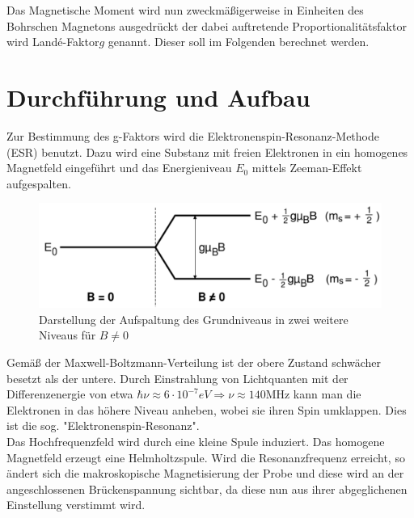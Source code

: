 Das Magnetische Moment wird nun zweckmäßigerweise in Einheiten des Bohrschen Magnetons ausgedrückt der dabei auftretende Proportionalitätsfaktor wird \glqq Landé-Faktor\grqq $g$  genannt. Dieser soll im Folgenden berechnet werden.
\section{Durchführung und Aufbau}
Zur Bestimmung des g-Faktors wird die Elektronenspin-Resonanz-Methode (ESR) benutzt. Dazu wird eine Substanz mit freien Elektronen in ein homogenes Magnetfeld eingeführt und das Energieniveau $E_0$ mittels Zeeman-Effekt aufgespalten.\\

\begin{figure}[H]
\includegraphics[scale=0.5]{../pics/aufsp.pdf}
\caption{Darstellung der Aufspaltung des Grundniveaus in zwei weitere Niveaus für $B\neq 0$}
\label{pic_aufspaltung}
\end{figure}

Gemäß der Maxwell-Boltzmann-Verteilung ist der obere Zustand schwächer besetzt als der untere. Durch Einstrahlung von Lichtquanten mit der Differenzenergie von etwa $\hbar\nu \approx 6\cdot10^{-7}eV \Rightarrow \nu \approx 140 \text{MHz}$ kann man die Elektronen in das höhere Niveau anheben, wobei sie ihren Spin umklappen. Dies ist die sog. "Elektronenspin-Resonanz".\\

Das Hochfrequenzfeld wird durch eine kleine Spule induziert. Das homogene Magnetfeld erzeugt eine Helmholtzspule. Wird die Resonanzfrequenz erreicht, so ändert sich die makroskopische Magnetisierung der Probe und diese wird an der angeschlossenen Brückenspannung sichtbar, da diese nun aus ihrer abgeglichenen Einstellung verstimmt wird.

